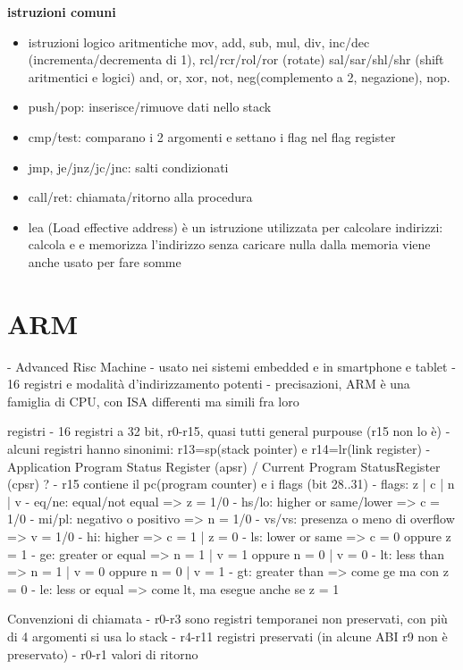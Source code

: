 \documentclass[12pt, a4paper]{article}
\begin{document}
\newpage
\textbf{istruzioni comuni}
\begin{itemize}
  \item istruzioni logico aritmentiche
  \subitem mov, add, sub, mul, div, inc/dec (incrementa/decrementa di 1), 
  \subitem rcl/rcr/rol/ror (rotate)
  \subitem sal/sar/shl/shr (shift aritmentici e logici)
  \subitem and, or, xor, not, neg(complemento a 2, negazione), nop.
  \item push/pop: inserisce/rimuove dati nello stack
  \item cmp/test: comparano i 2 argomenti e settano i flag nel flag register
  \item jmp, je/jnz/jc/jnc: salti condizionati
  \item call/ret: chiamata/ritorno alla procedura
  \item lea (Load effective address) è un istruzione utilizzata per calcolare indirizzi:
  \subitem calcola e e memorizza l'indirizzo senza caricare nulla dalla memoria
  \subitem viene anche usato per fare somme
\end{itemize}
 

\newpage
\section{ARM}
- Advanced Risc Machine
- usato nei sistemi embedded e in smartphone e tablet
- 16 registri e modalità d'indirizzamento potenti
- precisazioni, ARM è una famiglia di CPU, con ISA differenti ma simili fra loro 

registri
- 16 registri a 32 bit, r0-r15, quasi tutti general purpouse (r15 non lo è)
 - alcuni registri hanno sinonimi: r13=sp(stack pointer) e r14=lr(link register)
 - Application Program Status Register (apsr) / Current Program StatusRegister (cpsr) ?
 - r15 contiene il pc(program counter) e i flags (bit 28..31)
 - flags: z | c | n | v
  - eq/ne: equal/not equal => z = 1/0
  - hs/lo: higher or same/lower => c = 1/0
  - mi/pl: negativo o positivo => n = 1/0
  - vs/vs: presenza o meno di overflow => v = 1/0
  - hi: higher => c = 1 | z = 0
  - ls: lower or same => c = 0 oppure z = 1
  - ge: greater or equal => n = 1 | v = 1 oppure n = 0 | v = 0
  - lt: less than => n = 1 | v = 0 oppure n = 0 | v = 1
  - gt: greater than => come ge ma con z = 0
  - le: less or equal => come lt, ma esegue anche se z = 1

Convenzioni di chiamata
- r0-r3 sono registri temporanei non preservati, con più di 4 argomenti si usa lo stack
- r4-r11 registri preservati (in alcune ABI r9 non è preservato)
- r0-r1 valori di ritorno
\end{document}
